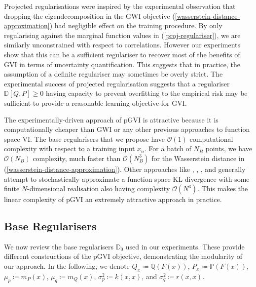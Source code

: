 \documentclass{article}
\newcommand{\vw}[1]{{\color{green} [VW: #1]}}
\numberwithin{equation}{section}
\begin{document}
Projected regularisations were inspired by the experimental observation that dropping the eigendecomposition in the GWI objective (\ref{wasserstein-distance-approximation}) had negligible effect on the training procedure.
By only regularising against the marginal function values in (\ref{proj-regulariser}), we are similarly unconstrained with respect to correlations.
However our experiments show that this can be a sufficient regulariser to recover most of the benefits of GVI in terms of uncertainty quantification. 
This suggests that in practice, the assumption of a definite regulariser may sometimes be overly strict.
The experimental success of projected regularisation suggests that a regulariser $\mathbb{D}[Q, P] \geq 0$ having capacity to prevent overfitting to the empirical risk may be sufficient to provide a reasonable learning objective for GVI.


The experimentally-driven approach of pGVI is attractive because it is computationally cheaper than GWI or any other previous approaches to function space VI.
The base regularisers that we propose have $\mathcal{O}(1)$ computational complexity with respect to a training input $x_n$.
For a batch of $N_B$ points, we have $\mathcal{O}(N_B)$ complexity, much faster than $\mathcal{O}(N_B^3)$ for the Wasserstein distance in (\ref{wasserstein-distance-approximation}).  
Other approaches like \cite{rudner2020rethinking}, \cite{sun2019functional}, \cite{ma2019variational}, and \cite{ma2021functional} generally attempt to stochastically approximate a function space KL divergence with some finite $N$-dimensional realisation also having complexity $\mathcal{O}(N^3)$. 
This makes the linear complexity of pGVI an extremely attractive approach in practice.

\subsection{Base Regularisers}
We now review the base regularisers $\mathbb{D}_0$ used in our experiments. 
These provide different constructions of the pGVI objective, demonstrating the modularity of our approach.
In the following, we denote $Q_{x} \coloneqq \mathbb{Q}\left(F(x)\right)$, $P_{x} \coloneqq \mathbb{P}\left(F(x)\right)$, $\mu_p \coloneqq m_P(x)$, $\mu_q \coloneqq m_Q(x)$, $\sigma_p^2 \coloneqq k(x, x)$, and $\sigma_q^2 \coloneqq r(x, x)$.
\end{document}
